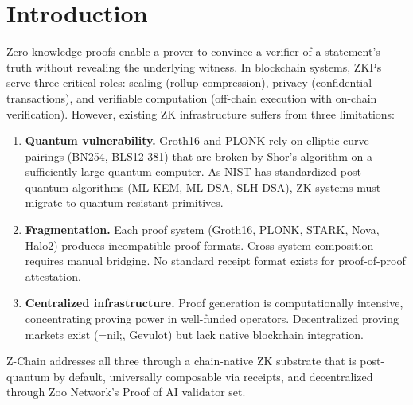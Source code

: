\section{Introduction}


Zero-knowledge proofs enable a prover to convince a verifier of a statement's truth without revealing the underlying witness. In blockchain systems, ZKPs serve three critical roles: scaling (rollup compression), privacy (confidential transactions), and verifiable computation (off-chain execution with on-chain verification). However, existing ZK infrastructure suffers from three limitations:

\begin{enumerate}
\item \textbf{Quantum vulnerability.} Groth16 and PLONK rely on elliptic curve pairings (BN254, BLS12-381) that are broken by Shor's algorithm on a sufficiently large quantum computer. As NIST has standardized post-quantum algorithms (ML-KEM, ML-DSA, SLH-DSA), ZK systems must migrate to quantum-resistant primitives.

\item \textbf{Fragmentation.} Each proof system (Groth16, PLONK, STARK, Nova, Halo2) produces incompatible proof formats. Cross-system composition requires manual bridging. No standard receipt format exists for proof-of-proof attestation.

\item \textbf{Centralized infrastructure.} Proof generation is computationally intensive, concentrating proving power in well-funded operators. Decentralized proving markets exist (=nil;, Gevulot) but lack native blockchain integration.
\end{enumerate}

Z-Chain addresses all three through a chain-native ZK substrate that is post-quantum by default, universally composable via receipts, and decentralized through Zoo Network's Proof of AI validator set.

